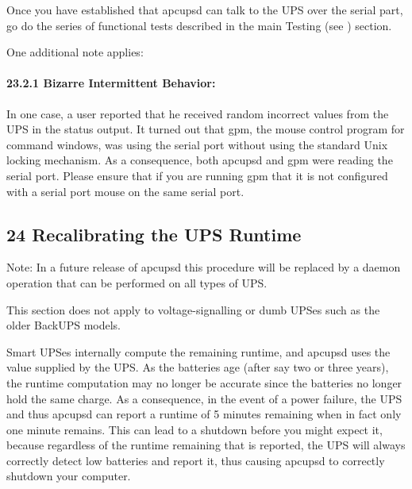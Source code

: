 \label{index-Testing-230}
Once you have established that apcupsd can talk to the UPS over the serial
part, go do the series of functional tests described in the main Testing (see 
) section.  

One additional note applies: 

\label{Bizarre-Intermittent-Behavior}

\paragraph*{23.2.1 Bizarre Intermittent Behavior:}

In one case, a user reported that he received random incorrect values from the
UPS in the status output. It turned out that gpm, the mouse control program
for command windows, was using the serial port without using the standard Unix
locking mechanism. As a consequence, both apcupsd and gpm were reading the
serial port. Please ensure that if you are running gpm that it is not
configured with a serial port mouse on the same serial port. 

\label{Recalibrating-the-UPS-Runtime}

\subsection*{24 Recalibrating the UPS Runtime}

\label{index-Runtime-recalibration-231}
\label{index-Recalibration-Runtime-232}
Note: In a future release of apcupsd this procedure will be replaced by a
daemon operation that can be performed on all types of UPS.  

This section does not apply to voltage-signalling or dumb UPSes such as the
older BackUPS models.  

Smart UPSes internally compute the remaining runtime, and apcupsd uses the
value supplied by the UPS. As the batteries age (after say two or three
years), the runtime computation may no longer be accurate since the batteries
no longer hold the same charge. As a consequence, in the event of a power
failure, the UPS and thus apcupsd can report a runtime of 5 minutes remaining
when in fact only one minute remains. This can lead to a shutdown before you
might expect it, because regardless of the runtime remaining that is reported,
the UPS will always correctly detect low batteries and report it, thus causing
apcupsd to correctly shutdown your computer.  

